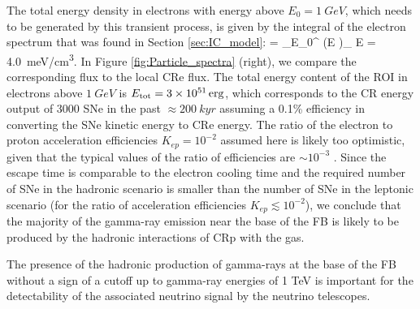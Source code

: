 The total energy density in electrons with energy above $E_0 = \SI{1}{GeV}$, which needs to be generated by this transient process, is given by the integral of the electron spectrum that was found in Section \ref{sec:IC_model}:
\be
{} = \int_{E_0}^{\infty} \left(E \right)_{\!\!\el} \de E = \SI{4.0}{meV/cm^3}.
\ee
In Figure \ref{fig:Particle_spectra} (right), we compare the corresponding flux to the local CRe flux.
The total energy content of the ROI in electrons above $\SI{1}{GeV}$ is $E_{\text{tot}} = \SI{3e51}{erg}$, which corresponds to the CR energy output of 3000 SNe in the past $\approx \SI{200}{kyr}$ assuming a 0.1\% efficiency in converting the SNe kinetic energy to CRe energy.
The ratio of the electron to proton acceleration efficiencies $K_{ep} = 10^{-2}$ assumed here is likely too optimistic,
given that the typical values of the ratio of efficiencies are $\sim 10^{-3}$ \citep[e.g.,][]{2015PhRvL.114h5003P}.
Since the escape time is comparable to the electron cooling time and the required number of SNe in the hadronic
scenario is smaller than the number of SNe in the leptonic scenario (for the ratio of acceleration efficiencies $K_{ep} \lesssim 10^{-2}$),
we conclude that the majority of the gamma-ray emission near the base of the FB 
is likely to be produced by the hadronic interactions of CRp with the gas.

The presence of the hadronic production of gamma-rays at the base of the FB without a sign of a cutoff up to gamma-ray energies
of 1 TeV is important for the detectability of the associated neutrino signal by the neutrino telescopes.

